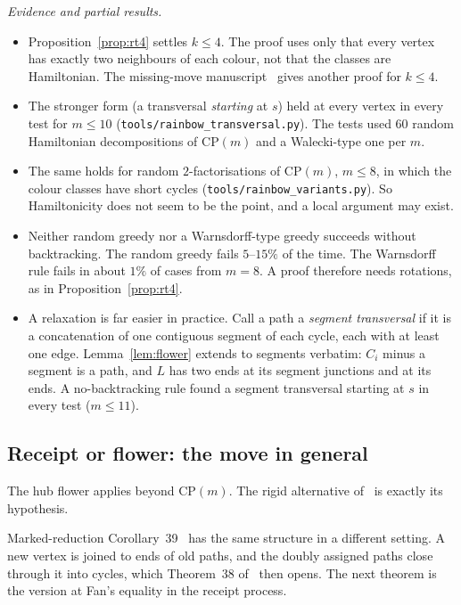 \documentclass[11pt]{amsart}
\theoremstyle{definition}
\begin{document}
\emph{Evidence and partial results.}
\begin{itemize}
\item Proposition~\ref{prop:rt4} settles $k\le4$. The proof uses only that every vertex has
exactly two neighbours of each colour, not that the classes are Hamiltonian. The missing-move
manuscript~\cite[Lemma~5.6]{MM} gives another proof for $k\le4$.
\item The stronger form (a transversal \emph{starting} at $s$) held at every vertex in every test
for $m\le10$ (\texttt{tools/rainbow\_transversal.py}). The tests used $60$ random Hamiltonian
decompositions of $\mathrm{CP}(m)$ and a Walecki-type one per $m$.
\item The same holds for random $2$-factorisations of $\mathrm{CP}(m)$, $m\le8$, in which the colour
classes have short cycles (\texttt{tools/rainbow\_variants.py}). So Hamiltonicity does not seem to
be the point, and a local argument may exist.
\item Neither random greedy nor a Warnsdorff-type greedy succeeds without backtracking. The random
greedy fails $5$--$15\%$ of the time. The Warnsdorff rule fails in about $1\%$ of cases from
$m=8$. A proof therefore needs rotations, as in Proposition~\ref{prop:rt4}.
\item A relaxation is far easier in practice. Call a path a \emph{segment transversal} if it is a
concatenation of one contiguous segment of each cycle, each with at least one edge. Lemma~\ref{lem:flower} extends to segments verbatim:
$C_i$ minus a segment is a path, and $L$ has two ends at its segment junctions and at its ends. A
no-backtracking rule found a segment transversal starting at $s$ in every test ($m\le11$).
\end{itemize}

\subsection*{Receipt or flower: the move in general}

The hub flower applies beyond $\mathrm{CP}(m)$. The rigid alternative of~\cite[Lemma~5.1]{MM} is
exactly its hypothesis.

Marked-reduction Corollary~39~\cite{MR} has the same structure in a different setting. A new
vertex is joined to ends of old paths, and the doubly assigned paths close through it into cycles,
which Theorem~38 of~\cite{MR} then opens. The next theorem is the version at Fan's equality in the
receipt process.
\end{document}
